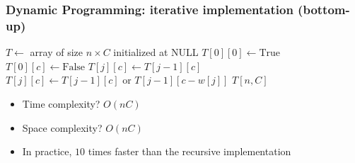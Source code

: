 \documentclass{beamer}
\begin{document}
\begin{frame}
  \frametitle{Dynamic Programming: iterative implementation (bottom-up)}

  \begin{algorithmic}
    \State$T \gets$ array of size $n \times C$ initialized at NULL
    \State$T[0][0] \gets \text{True}$
    \State$T[0][c] \gets \text{False}$
    \EndFor
    \State$T[j][c] \gets T[j - 1][c]$
    \EndFor
    \State$T[j][c] \gets T[j - 1][c] \text{ or } T[j - 1][c - w[j]]$
    \EndFor
    \EndFor
    \State\Return{}$T[n, C]$
    \EndProcedure{}
  \end{algorithmic}

  \begin{itemize}
    \item \pause Time complexity? \pause $O(nC)$
    \item \pause Space complexity? \pause $O(nC)$
    \item \pause In practice, $10$ times faster than the recursive implementation
  \end{itemize}

\end{frame}
\end{document}
